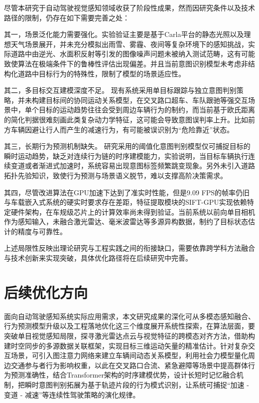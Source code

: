 尽管本研究于自动驾驶视觉感知领域收获了阶段性成果，然而因研究条件以及技术路径的限制，仍存在如下需要完善之处：

其一，场景泛化能力需要强化。实验验证主要是基于Carla平台的静态光照以及理想天气场景展开，并未充分模拟出雨雪、雾霾、夜间等复杂环境下的感知挑战，实际道路中由逆光、水面积反射等引发的图像噪声问题未被纳入测试范畴，这有可能致使算法在极端条件下的鲁棒性评估出现偏差。并且当前意图识别模型未考虑非结构化道路中目标行为的特殊性，限制了模型的场景适应性。

其二，多目标交互建模深度不足。 现有系统采用单目标跟踪与独立意图判别策略，并未构建目标间的协同运动关系模型，在交叉路口超车、车队跟驰等强交互场景中，单个目标的运动趋势往往会受到周边车辆行为的制约，而当前基于欧氏距离的简化判据很难刻画此类复杂动力学特征，这可能会导致意图误判率上升。比如前方车辆因避让行人而产生的减速行为，有可能被误识别为“危险靠近”状态。

其三，长期行为预测机制缺失。 研究采用的阈值化意图判别模型仅可捕捉目标的瞬时运动趋势，缺乏对连续行为链的时序建模能力，实验说明，当目标车辆执行连续变道或者渐进式加速时，系统容易出现意图标签频繁跳变现象。另外未引入道路拓扑先验知识，致使行为预测与场景语义脱节，难以支撑高阶决策需求。

其四，尽管改进算法在GPU加速下达到了准实时性能，但是9.09 FPS的帧率仍旧与车载嵌入式系统的硬实时要求存在差距，特征提取模块的SIFT-GPU实现依赖特定硬件架构，在车规级芯片上的计算效率尚未得到验证。当前系统以前向单目相机作为感知输入，未融合激光雷达、毫米波雷达等多源异构数据，制约了目标状态估计的精度与可靠性。

上述局限性反映出理论研究与工程实践之间的衔接缺口，需要依靠跨学科方法融合与技术创新来实现突破，具体优化路径将在后续研究中完善。

\section{后续优化方向}

面向自动驾驶感知系统实际应用需求，本文研究成果的深化可从多模态感知融合、行为预测模型升级以及工程落地优化这三个维度展开系统性探索，在算法层面，要突破单目视觉感知局限，探寻激光雷达点云与视觉特征的跨模态对齐方法，借助构建时空同步的多源数据关联框架，实现目标三维运动矢量的精准估计。针对复杂交互场景，可引入图注意力网络来建立车辆间动态关系模型，利用社会力模型量化周边交通参与者行为影响权重，以此在交叉路口合流、紧急避障等场景中提高群体行为预测准确性，结合Transformer架构的时序建模优势，设计长短时记忆融合机制，把瞬时意图判别拓展为基于轨迹片段的行为模式识别，让系统可捕捉“加速 - 变道 - 减速”等连续性驾驶策略的演化规律。

